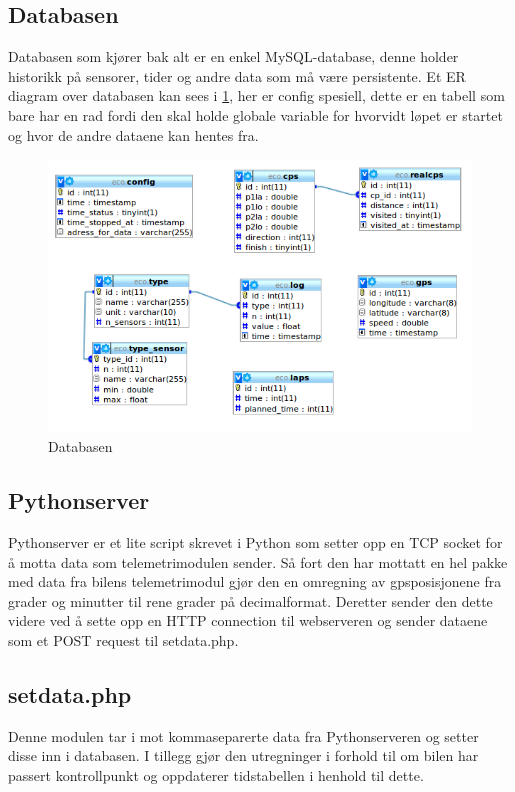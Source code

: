 \subsection{Databasen}
Databasen som kjører bak alt er en enkel MySQL-database, denne holder historikk på sensorer, tider og andre data som må være persistente. Et ER diagram over databasen kan sees i \ref{er}, her er config spesiell, dette er en tabell som bare har en rad fordi den skal holde globale variable for hvorvidt løpet er startet og hvor de andre dataene kan hentes fra.
\begin{figure}[H]
\caption{Databasen} 
\label{er}
\includegraphics[width=\textwidth]{images/er.png}
\end{figure}

\subsection{Pythonserver}
Pythonserver er et lite script skrevet i Python som setter opp en TCP socket for å motta data som telemetrimodulen sender. Så fort den har mottatt en hel pakke med data fra bilens telemetrimodul gjør den en omregning av gpsposisjonene fra grader og minutter til rene grader på decimalformat. Deretter sender den dette videre ved å sette opp en HTTP connection til webserveren og sender dataene som et POST request til setdata.php.
\subsection{setdata.php}
Denne modulen tar i mot kommaseparerte data fra Pythonserveren og setter disse inn i databasen. I tillegg gjør den utregninger i forhold til om bilen har passert kontrollpunkt og oppdaterer tidstabellen i henhold til dette.
